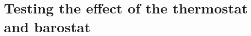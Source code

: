 \documentclass[aip,jcp,a4paper,preprint,onecolumn]{revtex4-1}
\begin{document}

\section{Testing the effect of the thermostat and barostat}





\end{document}
